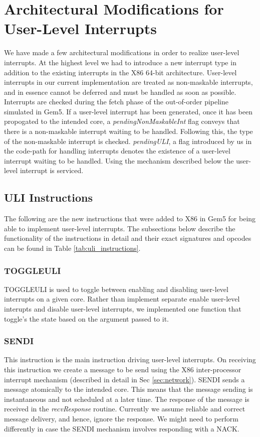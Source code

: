 \section{Architectural Modifications for User-Level Interrupts}\label{sec:arch}
We have made a few architectural modifications in order to realize user-level
interrupts. At the highest level we had to introduce a new interrupt type in
addition to the existing interrupts in the X86 64-bit architecture. User-level
interrupts in our current implementation are treated as non-maskable interrupts,
and in essence cannot be deferred and must be handled as soon as possible.
Interrupts are checked during the fetch phase of the out-of-order pipeline
simulated in Gem5. If a user-level interrupt has been generated, once it has
been propogated to the intended core, a \textit{pendingNonMaskableInt} flag
conveys that there is a non-maskable interrupt waiting to be handled. Following
this, the type of the non-maskable interrupt is checked. \textit{pendingULI}, a
flag introduced by us in the code-path for handling interrupts denotes the
existence of a user-level interrupt waiting to be handled. Using the mechanism
described below the user-level interrupt is serviced.

\subsection{ULI Instructions}
The following are the new instructions that were added to X86 in Gem5 for being
able to implement user-level interrupts. The subsections below describe the
functionality of the instructions in detail and their exact signatures and
opcodes can be found in Table \ref{tab:uli_instructions}.

\subsubsection{TOGGLEULI}
TOGGLEULI is used to toggle between enabling and disabling user-level
interrupts on a given core. Rather than implement separate enable user-level
interupts and disable user-level interrupts, we implemented one function that
toggle's the state based on the argument passed to it.

\subsubsection{SENDI}
This instruction is the main instruction driving user-level interrupts. On
receiving this instruction we create a message to be send using the X86
inter-processor interrupt mechanism (described in detail in Sec
\ref{sec:network}). SENDI sends a message atomically to the intended core. This
means that the message sending is instantaneous and not scheduled at a later
time. The response of the message is received in the \textit{recvResponse}
routine. Currently we assume reliable and correct message delivery, and hence,
ignore the response. We might need to perform differently in case the SENDI
mechanism involves responding with a NACK.

